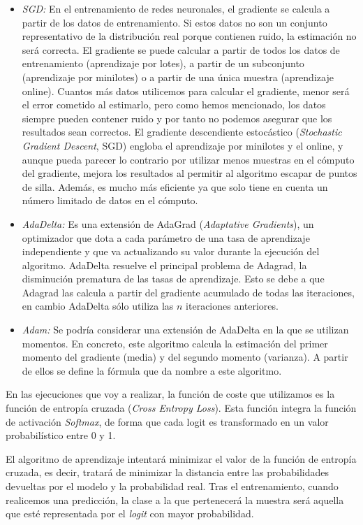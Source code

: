 \begin{itemize}
    \begin{itemize}
        \item \textit{SGD:} En el entrenamiento de redes neuronales, el gradiente se calcula a partir de los datos de entrenamiento. Si estos datos no son un conjunto representativo de la distribución real porque contienen ruido, la estimación no será correcta. El gradiente se puede calcular a partir de todos los datos de entrenamiento (aprendizaje por lotes), a partir de un subconjunto (aprendizaje por minilotes) o a partir de una única muestra (aprendizaje online). Cuantos más datos utilicemos para calcular el gradiente, menor será el error cometido al estimarlo, pero como hemos mencionado, los datos siempre pueden contener ruido y por tanto no podemos asegurar que los resultados sean correctos. El gradiente descendiente estocástico (\textit{Stochastic Gradient Descent}, SGD) engloba el aprendizaje por minilotes y el online, y aunque pueda parecer lo contrario por utilizar menos muestras en el cómputo del gradiente, mejora los resultados al permitir al algoritmo escapar de puntos de silla. Además, es mucho más eficiente ya que solo tiene en cuenta un número limitado de datos en el cómputo.
        \item \textit{AdaDelta:} Es una extensión de AdaGrad (\textit{Adaptative Gradients}), un optimizador que dota a cada parámetro de una tasa de aprendizaje independiente y que va actualizando su valor durante la ejecución del algoritmo. AdaDelta resuelve el principal problema de Adagrad, la disminución prematura de las tasas de aprendizaje. Esto se debe a que Adagrad las calcula a partir del gradiente acumulado de todas las iteraciones, en cambio AdaDelta sólo utiliza las $n$ iteraciones anteriores.
        \item \textit{Adam:} Se podría considerar una extensión de AdaDelta en la que se utilizan momentos. En concreto, este algoritmo calcula la estimación del primer momento del gradiente (media) y del segundo momento (varianza). A partir de ellos se define la fórmula que da nombre a este algoritmo.
    \end{itemize}
\end{itemize}

En las ejecuciones que voy a realizar, la función de coste que utilizamos es la función de entropía cruzada (\textit{Cross Entropy Loss}). Esta función integra la función de activación \textit{Softmax}, de forma que cada logit es transformado en un valor probabilístico entre 0 y 1. 

El algoritmo de aprendizaje intentará minimizar el valor de la función de entropía cruzada, es decir, tratará de minimizar la distancia entre las probabilidades devueltas por el modelo y la probabilidad real. Tras el entrenamiento, cuando realicemos una predicción, la clase a la que pertenecerá la muestra será aquella que esté representada por el \textit{logit} con mayor probabilidad. \cite{crossentropyloss}


